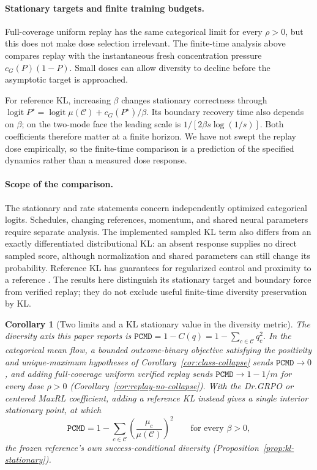 \documentclass{article}
\newcommand{\1}{\mathbf 1}
\newcommand{\pmd}{\texttt{PCMD}}
\newtheorem{corollary}[lemma]{Corollary}
\theoremstyle{remark}
\theoremstyle{definition}
\theoremstyle{plain}
\begin{document}
\paragraph{Stationary targets and finite training budgets.}
Full-coverage uniform replay has the same categorical limit for every
$\rho>0$, but this does not make dose selection irrelevant.
The finite-time analysis above compares replay with the instantaneous
fresh concentration pressure $c_G(P)(1-P)$. Small doses can allow diversity
to decline before the asymptotic target is approached.

For reference KL, increasing $\beta$ changes stationary correctness through
$\operatorname{logit}P^\star=\operatorname{logit}\mu(\mathcal C)+c_G(P^\star)/\beta$.
Its boundary recovery time also depends on $\beta$; on the two-mode face
the leading scale is $1/[2\beta s\log(1/s)]$.
Both coefficients therefore matter at a finite horizon. We have not swept
the replay dose empirically, so the finite-time comparison is a prediction of
the specified dynamics rather than a measured dose response.

\paragraph{Scope of the comparison.}
The stationary and rate statements concern independently optimized
categorical logits. Schedules, changing references, momentum, and shared
neural parameters require separate analysis. The implemented sampled KL
term also differs from an exactly differentiated distributional KL:
an absent response supplies no direct sampled score, although normalization
and shared parameters can still change its probability.
Reference KL has guarantees for regularized control and proximity to a
reference \citep{geist2019regmdp,vieillard2020kl}. The results here distinguish
its stationary target and boundary force from verified replay; they do not
exclude useful finite-time diversity preservation by KL.

\begin{corollary}[Two limits and a KL stationary value in the diversity metric]
\label{cor:pmd-limits}
The diversity axis this paper reports is
$\pmd{}=1-C(q)=1-\sum_{c\in\mathcal C}q_c^2$. In the categorical mean flow, a
bounded outcome-binary objective satisfying the positivity and unique-maximum
hypotheses of Corollary~\ref{cor:class-collapse} sends $\pmd{}\to0$, and adding full-coverage uniform verified
replay sends $\pmd{}\to1-1/m$ for every dose $\rho>0$
(Corollary~\ref{cor:replay-no-collapse}). With the Dr.GRPO or centered MaxRL coefficient, adding a reference KL
instead gives a single interior stationary point, at which
\[
 \pmd{}=1-\sum_{c\in\mathcal C}
   \left(\frac{\mu_c}{\mu(\mathcal C)}\right)^{\!2}
 \qquad\text{for every }\beta>0,
\]
the frozen reference's own success-conditional diversity
(Proposition~\ref{prop:kl-stationary}).
\end{corollary}
\end{document}
